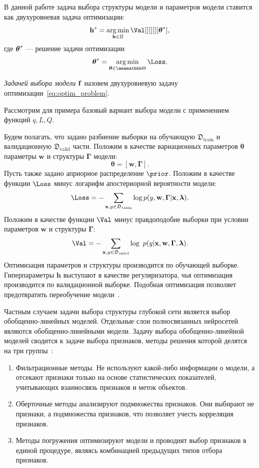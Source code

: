  

В данной работе задача выбора структуры модели и параметров модели ставится как двухуровневая задача оптимизации:
\begin{equation}
\label{eq:optim_problem}
	\h^{*} = \argmin_{\h  \in \Hb} \Val[][][][\teta^{*}],
\end{equation}
где $\boldsymbol{\theta}^{*}$ --- решение задачи оптимизации
\begin{equation}
\label{eq:optim_problem_in}
   \teta^{*} = \argmin_{\teta \in \Tetab} \Loss.
\end{equation}

\begin{defin}
\textit{Задачей выбора модели} $\mathbf{f}$ назовем   двухуровневую задачу оптимизации~\eqref{eq:optim_problem}.
\end{defin}

Рассмотрим для примера базовый вариант выбора модели с применением функций $q, L, Q$.
\begin{example}
Будем полагать, что задано разбиение выборки на обучающую $\mathfrak{D}_\text{train}$ и валидационную $\mathfrak{D}_\text{valid}$ части.
Положим в качестве вариационных параметров $\boldsymbol{\theta}$ параметры $\mathbf{w}$ и структуры $\boldsymbol{\Gamma}$ модели:
\[
    \boldsymbol{\theta} = [\mathbf{w}, \boldsymbol{\Gamma}].
\]
Пусть также задано априорное распределение $\prior$.
Положим в качестве функции $\Loss$ минус логарифм апостериорной вероятности модели:
\[
    \Loss = -\sum_{\mathbf{x},y \in \mathfrak{D}_\text{train}} \log p(y, \mathbf{w}, \boldsymbol{\Gamma}|\mathbf{x}, \lam).
\]
Положим в качестве функции $\Val$  минус правдоподобие выборки при условии параметров $\mathbf{w}$ и структуры $\boldsymbol{\Gamma}$:
\[
    \Val = -\sum_{\mathbf{x},y \in \mathfrak{D}_\text{valid}} \log~p(y|\x, \mathbf{w}, \boldsymbol{\Gamma}, \lam).
\]
Оптимизация параметров и структуры производится по обучающей выборке. Гиперпараметры $\mathbf{h}$ выступают в качестве регуляризатора, чья оптимизация производится по валидационной выборке. Подобная оптимизация позволяет предотвратить переобучение модели~\cite{hyper}.
\end{example}

Частным случаем задачи выбора структуры глубокой сети является выбор обобщенно-линейных моделей. Отдельные слои полносвязанных нейросетей являются обобщенно-линейными модели. Задачу выбора обобщенно-линейной моделей сводится к задаче выбора признаков, методы решения которой делятся на три группы~\cite{feature_select}:
\begin{enumerate}
\item Фильтрационные методы. Не используют какой-либо информации о модели, а отсекают признаки только на основе статистических показателей, учитывающих взаимосвязь признаков и меток объектов.
\item Оберточные методы  анализируют подмножества признаков. Они выбирают не признаки, а подмножества признаков, что позволяет учесть корреляция признаков.
\item Методы погружения оптимизируют модели и проводият выбор признаков в единой процедуре, являясь комбинацией предыдущих типов отбора признаков.
\end{enumerate} 

